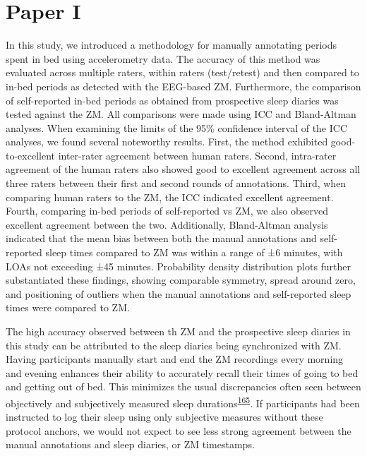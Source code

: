 \documentclass[
  10pt,
]{scrbook}
\begin{document}
\hypertarget{paper-i}{%
\section{Paper I}\label{paper-i}}

In this study, we introduced a methodology for manually annotating
periods spent in bed using accelerometry data. The accuracy of this
method was evaluated across multiple raters, within raters (test/retest)
and then compared to in-bed periods as detected with the EEG-based ZM.
Furthermore, the comparison of self-reported in-bed periods as obtained
from prospective sleep diaries was tested against the ZM. All
comparisons were made using ICC and Bland-Altman analyses. When
examining the limits of the 95\% confidence interval of the ICC
analyses, we found several noteworthy results. First, the method
exhibited good-to-excellent inter-rater agreement between human raters.
Second, intra-rater agreement of the human raters also showed good to
excellent agreement across all three raters between their first and
second rounds of annotations. Third, when comparing human raters to the
ZM, the ICC indicated excellent agreement. Fourth, comparing in-bed
periods of self-reported vs ZM, we also observed excellent agreement
between the two. Additionally, Bland-Altman analysis indicated that the
mean bias between both the manual annotations and self-reported sleep
times compared to ZM was within a range of ±6 minutes, with LOAs not
exceeding ±45 minutes. Probability density distribution plots further
substantiated these findings, showing comparable symmetry, spread around
zero, and positioning of outliers when the manual annotations and
self-reported sleep times were compared to ZM.

The high accuracy observed between th ZM and the prospective sleep
diaries in this study can be attributed to the sleep diaries being
synchronized with ZM. Having participants manually start and end the ZM
recordings every morning and evening enhances their ability to
accurately recall their times of going to bed and getting out of bed.
This minimizes the usual discrepancies often seen between objectively
and subjectively measured sleep
durations\textsuperscript{\protect\hyperlink{ref-aili_reliability_2017}{165}}.
If participants had been instructed to log their sleep using only
subjective measures without these protocol anchors, we would not expect
to see less strong agreement between the manual annotations and sleep
diaries, or ZM timestamps.
\end{document}
